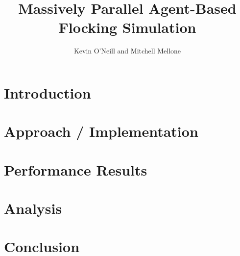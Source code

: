 \documentclass[10pt, twocolumn]{article}
\title{Massively Parallel Agent-Based Flocking Simulation}
\author{Kevin O'Neill and Mitchell Mellone}
\date{}
\begin{document}
\maketitle

\begin{abstract}
  
\end{abstract}

\section*{Introduction}


\section*{Approach / Implementation}


\section*{Performance Results}


\section*{Analysis}


\section*{Conclusion}

\end{document}
